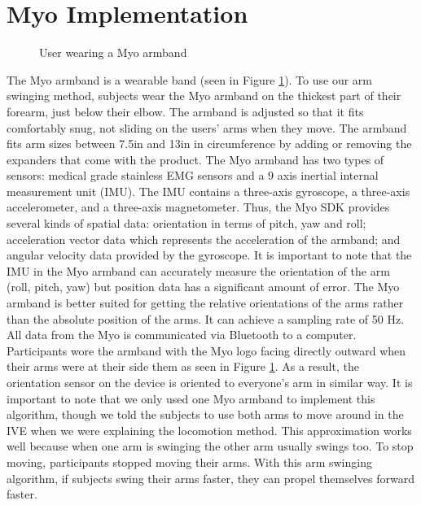 \documentclass{vgtc}                          %
\begin{document}
\section{Myo Implementation}
\begin{figure}[h]
  \centering
  \def\svgwidth{.2\textwidth}
  
  \caption{User wearing a Myo armband}
  \label{fig:morgan}
\end{figure}
The Myo armband is a wearable band (seen in Figure \ref{fig:morgan}).
To use our arm swinging method, subjects wear the Myo armband on the thickest part of their forearm, just below their elbow.
The armband is adjusted so that it fits comfortably snug, not sliding on the users' arms when they move.
The armband fits arm sizes between 7.5in and 13in in circumference
by adding or removing the expanders that come with the product.
The Myo armband has two types of sensors:
medical grade stainless EMG sensors
and a 9 axis inertial internal measurement unit (IMU).
The IMU contains a three-axis gyroscope, a three-axis accelerometer, and a three-axis magnetometer.
Thus, the Myo SDK provides several kinds of spatial data: orientation in terms of pitch, yaw and roll;
acceleration vector data which represents the acceleration of the armband;
and angular velocity data provided by the gyroscope.
It is important to note that the IMU in the Myo armband can accurately measure the orientation of the arm (roll, pitch, yaw)
but position data has a significant amount of error.
The Myo armband is better suited for getting the relative orientations of the arms rather than the
absolute position of the arms.
It can achieve a sampling rate of 50 Hz.
All data from the Myo is communicated via Bluetooth to a computer.
Participants wore the armband
with the Myo logo facing directly outward when their arms were
at their side them as seen in Figure \ref{fig:morgan}.
As a result, the orientation sensor on the device is oriented to everyone's arm in similar way.
It is important to note that we only used one Myo armband to implement this algorithm,
though we told the subjects to use both arms to move around in the IVE
when we were explaining the locomotion method.
This approximation works well because when one arm is swinging the other arm usually swings too.
To stop moving, participants stopped moving their arms.
With this arm swinging algorithm, if subjects swing their arms faster, they can propel themselves forward faster.
\end{document}
